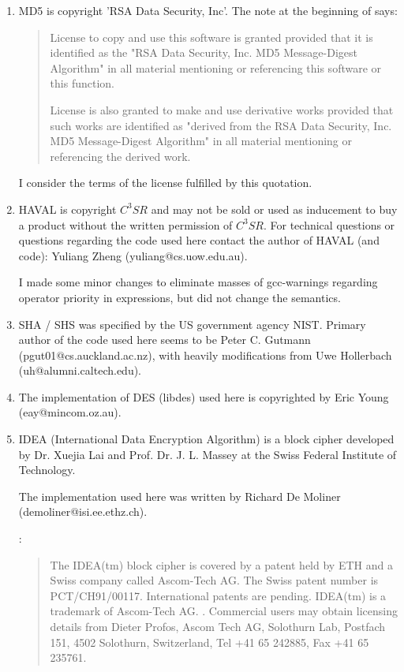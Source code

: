 \begin {enumerate}
\item	MD5 is copyright 'RSA Data Security, Inc'. The note at the
	beginning of  says:

	\begin {quotation}
		License to copy and use this software is granted
		provided that it is identified as the "RSA Data
		Security, Inc. MD5 Message-Digest Algorithm" in all
		material mentioning or referencing this software or
		this function.
                                                                  
		License is also granted to make and use derivative
		works provided that such works are identified as
		"derived from the RSA Data Security, Inc. MD5
		Message-Digest Algorithm" in all material mentioning
		or referencing the derived work.
	\end   {quotation}

	I consider the terms of the license fulfilled by this
	quotation. 

\item	HAVAL is copyright $C^3SR$ and may not be sold or used as
	inducement to buy a product without the written permission of
	$C^3SR$. For technical questions or questions regarding the
	code used here contact the author of HAVAL (and code): Yuliang
	Zheng (yuliang@cs.uow.edu.au).

	I made some minor changes to eliminate masses of \cmd
	{gcc}-warnings regarding operator priority in expressions, but
	did not change the semantics.


\item	SHA / SHS was specified by the US government agency
	NIST. Primary author of the code used here seems to be Peter
	C. Gutmann (pgut01@cs.auckland.ac.nz), with heavily
	modifications from Uwe Hollerbach (uh@alumni.caltech.edu).

\item	The implementation of DES (libdes) used here is copyrighted by
	Eric Young (eay@mincom.oz.au).

\item	IDEA (International Data Encryption Algorithm) is a block
	cipher developed  by  Dr.  Xuejia  Lai  and
	Prof. Dr. J. L. Massey at the Swiss Federal Institute of
	Technology.

	The implementation used here was written by Richard De Moliner
	(demoliner@isi.ee.ethz.ch).

	:
	\begin {quotation}
		The IDEA(tm) block cipher is covered by a patent held
		by ETH and a Swiss company called Ascom-Tech AG.  The
		Swiss patent number is PCT/CH91/00117.  International
		patents are pending. IDEA(tm) is a trademark of
		Ascom-Tech AG.  .  Commercial users may obtain
		licensing details from Dieter Profos, Ascom Tech AG,
		Solothurn Lab, Postfach 151, 4502 Solothurn,
		Switzerland, Tel +41 65 242885, Fax +41 65 235761. 
	\end {quotation}


\end{enumerate}
